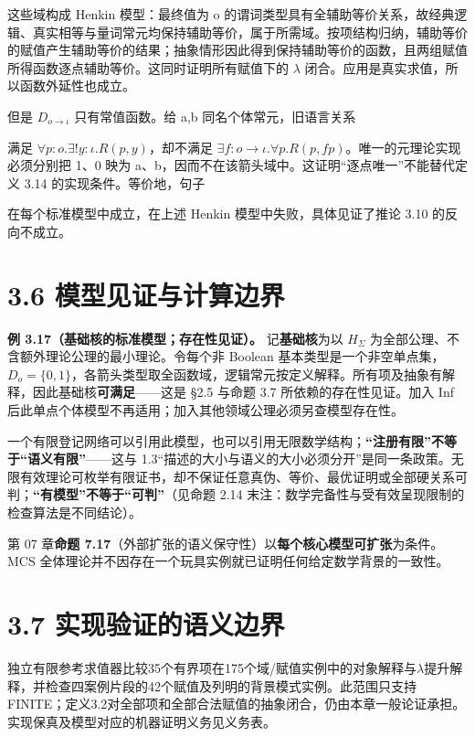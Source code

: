 \documentclass[UTF8,a4paper,zihao=-4,fontset=windows,openany]{ctexbook}
\newcommand{\mcsdisplay}[1]{%
  \par\addvspace{0.7em}%
  \sbox{\mcsmathbox}{\ensuremath{\displaystyle #1}}%
  \ifdim\wd\mcsmathbox>\linewidth
    \noindent\resizebox{\linewidth}{!}{\usebox{\mcsmathbox}}%
  \else
    \noindent\hspace*{\fill}\usebox{\mcsmathbox}\hspace*{\fill}%
  \fi
  \par\addvspace{0.7em}%
}
\def\ensuremath#1{#1}%
\def\mathrm#1{#1}%
\begin{document}
这些域构成 Henkin 模型：最终值为 o 的谓词类型具有全辅助等价关系，故经典逻辑、真实相等与量词常元均保持辅助等价，属于所需域。按项结构归纳，辅助等价的赋值产生辅助等价的结果；抽象情形因此得到保持辅助等价的函数，且两组赋值所得函数逐点辅助等价。这同时证明所有赋值下的 \(\lambda\) 闭合。应用是真实求值，所以函数外延性也成立。

但是 \(D_{o\to\iota}\) 只有常值函数。给 a,b 同名个体常元，旧语言关系


\mcsdisplay{R(p,y)\equiv(p\land y=a)\lor(\neg p\land y=b)}
\noindent 满足 \(\forall p:o.\exists!y:\iota.R(p,y)\)，却不满足 \(\exists f:o\to\iota.\forall p.R(p,\mathrm{fp})\)。唯一的元理论实现必须分别把 1、0 映为 a、b，因而不在该箭头域中。这证明“逐点唯一”不能替代定义 3.14 的实现条件。等价地，句子


\mcsdisplay{\forall a,b:\iota.\;\exists f:o\to\iota.\,
(f\top=a\land f\bot=b)}
\noindent 在每个标准模型中成立，在上述 Henkin 模型中失败，具体见证了推论 3.10 的反向不成立。

\section{3.6 模型见证与计算边界}
\textbf{例 3.17（基础核的标准模型；存在性见证）。} 记\textbf{基础核}为以 \(H_\Sigma\) 为全部公理、不含额外理论公理的最小理论。令每个非 Boolean 基本类型是一个非空单点集，\(D_o=\{0,1\}\)，各箭头类型取全函数域，逻辑常元按定义解释。所有项及抽象有解释，因此基础核\textbf{可满足}——这是 §2.5 与命题 3.7 所依赖的存在性见证。加入 Inf 后此单点个体模型不再适用；加入其他领域公理必须另查模型存在性。

一个有限登记网络可以引用此模型，也可以引用无限数学结构；\textbf{“注册有限”不等于“语义有限”}——这与 1.3“描述的大小与语义的大小必须分开”是同一条政策。无限有效理论可枚举有限证书，却不保证任意真伪、等价、最优证明或全部硬关系可判；\textbf{“有模型”不等于“可判”}（见命题 2.14 末注：数学完备性与受有效呈现限制的检查算法是不同结论）。

第 07 章\textbf{命题 7.17}（外部扩张的语义保守性）以\textbf{每个核心模型可扩张}为条件。MCS 全体理论并不因存在一个玩具实例就已证明任何给定数学背景的一致性。

\section{3.7 实现验证的语义边界}
独立有限参考求值器比较35个有界项在175个域/赋值实例中的对象解释与\(\lambda\)提升解释，并检查四案例片段的42个赋值及列明的背景模式实例。此范围只支持 FINITE；定义3.2对全部项和全部合法赋值的抽象闭合，仍由本章一般论证承担。实现保真及模型对应的机器证明义务见义务表。
\end{document}
